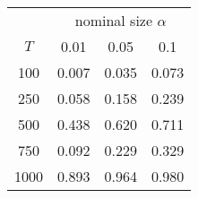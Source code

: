 % 
\begin{tabular}{cccc}
  \hline
  & \multicolumn{3}{c}{nominal size $\alpha$} \\
 $T$ & 0.01 & 0.05 & 0.1 \\
 \hline
100 & 0.007 & 0.035 & 0.073 \\ 
  250 & 0.058 & 0.158 & 0.239 \\ 
  500 & 0.438 & 0.620 & 0.711 \\ 
  750 & 0.092 & 0.229 & 0.329 \\ 
  1000 & 0.893 & 0.964 & 0.980 \\ 
   \hline
\end{tabular}
